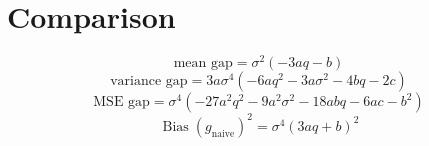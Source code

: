 \documentclass{article}
\begin{document}
\section*{Comparison}
\begin{dmath*}
\text{mean gap} = \sigma^{2} \left(- 3 a q - b\right)
\end{dmath*}
\begin{dmath*}
\text{variance gap} = 3 a \sigma^{4} \left(- 6 a q^{2} - 3 a \sigma^{2} - 4 b q - 2 c\right)
\end{dmath*}
\begin{dmath*}
\text{MSE gap} = \sigma^{4} \left(- 27 a^{2} q^{2} - 9 a^{2} \sigma^{2} - 18 a b q - 6 a c - b^{2}\right)
\end{dmath*}
\begin{dmath*}
\operatorname{Bias}(g_{\mathrm{naive}})^2 = \sigma^{4} \left(3 a q + b\right)^{2}
\end{dmath*}
\end{document}
